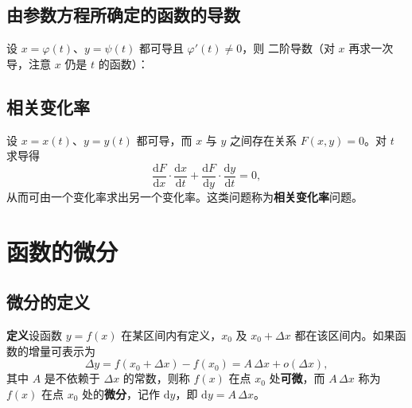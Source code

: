 \subsection{由参数方程所确定的函数的导数}
设 $x=\varphi(t)$、$y=\psi(t)$ 都可导且 $\varphi'(t)\neq0$，则
\noindent 二阶导数（对 $x$ 再求一次导，注意 $x$ 仍是 $t$ 的函数）：


\subsection{相关变化率}
设 $x=x(t)$、$y=y(t)$ 都可导，而 $x$ 与 $y$ 之间存在关系 $F(x,y)=0$。对 $t$ 求导得
\[
\frac{\mathrm{d}F}{\mathrm{d}x}\cdot\frac{\mathrm{d}x}{\mathrm{d}t}+\frac{\mathrm{d}F}{\mathrm{d}y}\cdot\frac{\mathrm{d}y}{\mathrm{d}t}=0,
\]
从而可由一个变化率求出另一个变化率。这类问题称为\textbf{相关变化率}问题。


\section{函数的微分}

\subsection{微分的定义}
\textbf{定义}\quad 设函数 $y=f(x)$ 在某区间内有定义，$x_0$ 及 $x_0+\Delta x$ 都在该区间内。如果函数的增量可表示为
\[
\Delta y=f(x_0+\Delta x)-f(x_0)=A\,\Delta x+o(\Delta x),
\]
其中 $A$ 是不依赖于 $\Delta x$ 的常数，则称 $f(x)$ 在点 $x_0$ 处\textbf{可微}，而 $A\,\Delta x$ 称为 $f(x)$ 在点 $x_0$ 处的\textbf{微分}，记作 $\mathrm{d}y$，即 $\mathrm{d}y=A\,\Delta x$。

